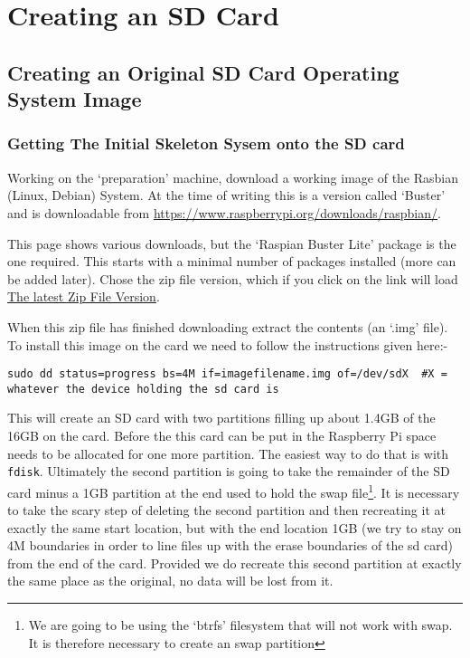 \documentclass[Draft]{akc}
\begin{document}
\section{Creating an SD Card}
\subsection{Creating an Original SD Card Operating System Image}
\subsubsection{Getting The Initial Skeleton Sysem onto the SD card}
Working on the `preparation' machine, download a working image of the Rasbian (Linux, Debian) System.  At the time of writing
this is a version called `Buster' and is downloadable from
\url{https://www.raspberrypi.org/downloads/raspbian/}.

This page shows various downloads, but the `Raspian Buster Lite' package is the one required. This starts
with a minimal number of packages installed (more can be added later). Chose the zip file version,
which if you click on the link will load
\href{https://downloads.raspberrypi.org/raspbian_lite_latest} {The latest Zip File Version}.

When this zip file has finished downloading extract the contents (an `.img' file).
To install this image on the card we need to follow the instructions given here:-

\begin{lstlisting}
sudo dd status=progress bs=4M if=imagefilename.img of=/dev/sdX  #X = whatever the device holding the sd card is
\end{lstlisting}

This will create an SD card with two partitions filling up about 1.4GB of the 16GB on the card.
Before the this card can be put in the Raspberry Pi space needs to be allocated for one more
partition.  The easiest way to do that is with  \texttt{fdisk}.  Ultimately the second partition is
going to take the remainder of the SD card minus a 1GB partition at the end used to hold the swap
file\footnote{We are going to be using the `btrfs' filesystem that will not work with swap. It is
therefore necessary to create an swap partition}.  It is necessary to
take the scary step of deleting the second partition and then recreating it at exactly the same
start location, but with the end location 1GB (we try to stay on 4M boundaries in order to line files up
with the erase boundaries of the sd card) from the end of the card. Provided we do recreate this
second partition at exactly the same place as the original, no data will be lost from it.
\end{document}
